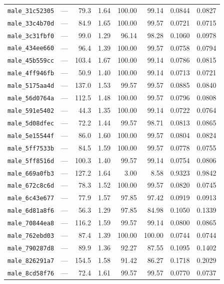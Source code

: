 \documentclass[11pt]{article}
\begin{document}
\begin{longtable}{lrrrrrrr}
\texttt{male\_31c52305} & --- & 79.3 & 1.64 & 100.00 & 99.14 & 0.0844 & 0.0827 \\
\texttt{male\_33c4b70d} & --- & 84.9 & 1.65 & 100.00 & 99.57 & 0.0721 & 0.0715 \\
\texttt{male\_3c31fbf0} & --- & 99.0 & 1.29 & 96.14 & 98.28 & 0.1060 & 0.0978 \\
\texttt{male\_434ee660} & --- & 96.4 & 1.39 & 100.00 & 99.57 & 0.0758 & 0.0794 \\
\texttt{male\_45b559cc} & --- & 103.4 & 1.67 & 100.00 & 99.14 & 0.0786 & 0.0815 \\
\texttt{male\_4ff946fb} & --- & 50.9 & 1.40 & 100.00 & 99.14 & 0.0713 & 0.0721 \\
\texttt{male\_5175aa4d} & --- & 137.0 & 1.53 & 99.57 & 99.57 & 0.0885 & 0.0840 \\
\texttt{male\_56d0764a} & --- & 112.5 & 1.48 & 100.00 & 99.57 & 0.0796 & 0.0808 \\
\texttt{male\_591e5402} & --- & 44.3 & 1.35 & 100.00 & 99.14 & 0.0722 & 0.0764 \\
\texttt{male\_5d08dfec} & --- & 72.2 & 1.44 & 99.57 & 98.71 & 0.0813 & 0.0865 \\
\texttt{male\_5e15544f} & --- & 86.0 & 1.60 & 100.00 & 99.57 & 0.0804 & 0.0824 \\
\texttt{male\_5ff7533b} & --- & 84.5 & 1.59 & 100.00 & 99.57 & 0.0778 & 0.0755 \\
\texttt{male\_5ff8516d} & --- & 100.3 & 1.40 & 99.57 & 99.14 & 0.0754 & 0.0806 \\
\texttt{male\_669a0fb3} & --- & 127.2 & 1.64 & 3.00 & 8.58 & 0.9323 & 0.9842 \\
\texttt{male\_672c8c6d} & --- & 78.3 & 1.52 & 100.00 & 99.57 & 0.0820 & 0.0745 \\
\texttt{male\_6c43e677} & --- & 77.9 & 1.57 & 97.85 & 97.42 & 0.0919 & 0.0913 \\
\texttt{male\_6d81a8f6} & --- & 56.3 & 1.29 & 97.85 & 84.98 & 0.1050 & 0.1339 \\
\texttt{male\_70844ea8} & --- & 116.2 & 1.59 & 99.57 & 99.14 & 0.0800 & 0.0865 \\
\texttt{male\_762ebd03} & --- & 87.4 & 1.39 & 100.00 & 100.00 & 0.0744 & 0.0744 \\
\texttt{male\_790287d8} & --- & 89.9 & 1.36 & 92.27 & 87.55 & 0.1095 & 0.1402 \\
\texttt{male\_826291a7} & --- & 154.5 & 1.58 & 91.42 & 86.27 & 0.1718 & 0.2029 \\
\texttt{male\_8cd58f76} & --- & 72.4 & 1.61 & 99.57 & 99.57 & 0.0770 & 0.0737 \\

\end{longtable}
\end{document}
